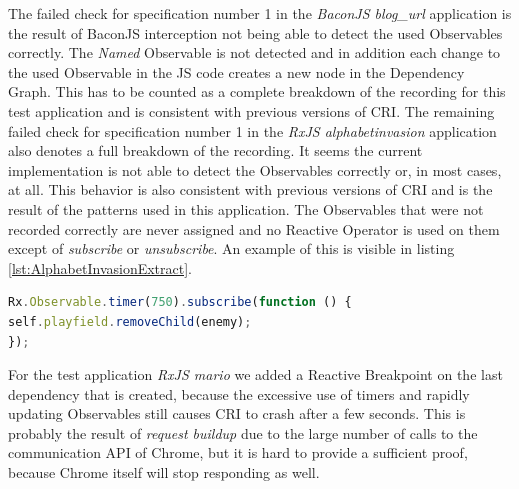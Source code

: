 The failed check for specification number 1 in the \emph{BaconJS blog\_url} application is the result of BaconJS interception not being able to detect the used Observables correctly. The \emph{Named} Observable is not detected and in addition each change to the used Observable in the JS code creates a new node in the Dependency Graph. This has to be counted as a complete breakdown of the recording for this test application and is consistent with previous versions of CRI. The remaining failed check for specification number 1 in the \emph{RxJS alphabetinvasion} application also denotes a full breakdown of the recording. It seems the current implementation is not able to detect the Observables correctly or, in most cases, at all. This behavior is also consistent with previous versions of CRI and is the result of the patterns used in this application. The Observables that were not recorded correctly are never assigned and no Reactive Operator is used on them except of \emph{subscribe} or \emph{unsubscribe}. An example of this is visible in listing \ref{lst:AlphabetInvasionExtract}.

\begin{lstlisting}[language=JavaScript, caption={Extract of RxJS AlphabetInvasion test application.},label={lst:AlphabetInvasionExtract}]
Rx.Observable.timer(750).subscribe(function () {
self.playfield.removeChild(enemy);
});	
\end{lstlisting}

For the test application \emph{RxJS mario} we added a Reactive Breakpoint on the last dependency that is created, because the excessive use of timers and rapidly updating Observables still causes CRI to crash after a few seconds. This is probably the result of \emph{request buildup} due to the large number of calls to the communication API of Chrome, but it is hard to provide a sufficient proof, because Chrome itself will stop responding as well.

